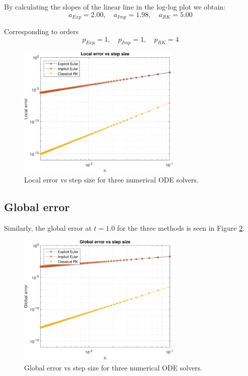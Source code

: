 By calculating the slopes of the linear line in the log-log plot we obtain:
$$
a_{Exp} = 2.00, \quad a_{Imp} = 1.98, \quad a_{RK} = 5.00
$$

Corresponding to orders
$$
p_{Exp} = 1, \quad p_{Imp} = 1, \quad p_{RK} = 4
$$


\begin{figure}[H]
    \centering
    \includegraphics[width=0.7\textwidth]{plots/1_4.pdf}
    \caption{Local error vs step size for three numerical ODE solvers.}
    \label{fig:1_4}
\end{figure}



\subsection{Global error}
Similarly, the global error at $t=1.0$ for the three methods is seen in Figure \ref{fig:1_5}.

\begin{figure}[H]
    \centering
    \includegraphics[width=0.7\textwidth]{plots/1_5.pdf}
    \caption{Global error vs step size for three numerical ODE solvers.}
    \label{fig:1_5}
\end{figure}

